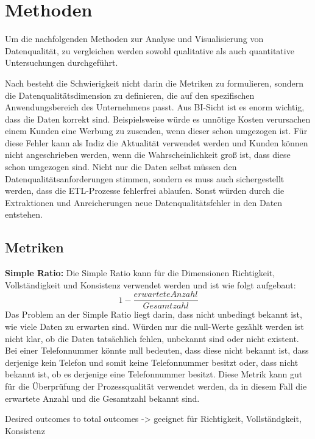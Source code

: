 \chapter{Methoden}\label{ch:method}
Um die nachfolgenden Methoden zur Analyse und Visualisierung von Datenqualität, zu vergleichen werden sowohl qualitative als auch quantitative Untersuchungen durchgeführt.

Nach \cite{pipino2002} besteht die Schwierigkeit nicht darin die Metriken zu formulieren, sondern die Datenqualitätsdimension zu definieren, die auf den spezifischen Anwendungsbereich des Unternehmens passt. 
Aus BI-Sicht ist es enorm wichtig, dass die Daten korrekt sind. 
Beispielsweise würde es unnötige Kosten verursachen einem Kunden eine Werbung zu zusenden, wenn dieser schon umgezogen ist.
Für diese Fehler kann als Indiz die Aktualität verwendet werden und Kunden können nicht angeschrieben werden, wenn die Wahrscheinlichkeit groß ist, dass diese schon umgezogen sind. 
Nicht nur die Daten selbst müssen den Datenqualitätsanforderungen stimmen, sondern es muss auch sichergestellt werden, dass die ETL-Prozesse fehlerfrei ablaufen. 
Sonst würden durch die Extraktionen und Anreicherungen neue Datenqualitätsfehler in den Daten entstehen.


\section{Metriken}

\textbf{Simple Ratio:}
Die Simple Ratio kann für die Dimensionen Richtigkeit, Vollständigkeit und Konsistenz verwendet werden und ist wie folgt aufgebaut: \cite{pipino2002}
$$ 1 - \frac{erwartete Anzahl}{Gesamtzahl} $$
Das Problem an der Simple Ratio liegt darin, dass nicht unbedingt bekannt ist, wie viele Daten zu erwarten sind. 
Würden nur die null-Werte gezählt werden ist nicht klar, ob die Daten tatsächlich fehlen, unbekannt sind oder nicht existent.
Bei einer Telefonnummer könnte null bedeuten, dass diese nicht bekannt ist, dass derjenige kein Telefon und somit keine Telefonnummer besitzt oder, dass nicht bekannt ist, ob es derjenige eine Telefonnummer besitzt. 
Diese Metrik kann gut für die Überprüfung der Prozessqualität verwendet werden, da in diesem Fall die erwartete Anzahl und die Gesamtzahl bekannt sind.


Desired outcomes to total outcomes 
-> geeignet für Richtigkeit, Vollständgkeit, Konsistenz


